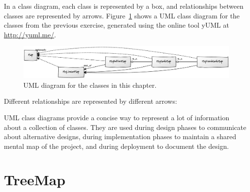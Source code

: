 \documentclass[12pt]{book}
\theoremstyle{exercise}
\newcommand{\java}{\verb}%}
\begin{document}
In a class diagram, each class is represented by a box, and
relationships between classes are represented by
arrows. Figure~\ref{fig-uml} shows a UML class diagram for the classes
from the previous exercise, generated using the online tool yUML at
\url{http://yuml.me/}.

\begin{figure}
\centering
\includegraphics[width=5in]{figs/yuml1.pdf}
\caption{UML diagram for the classes in this chapter.}
\label{fig-uml}
\end{figure}


Different relationships are represented by different arrows:


UML class diagrams provide a concise way to represent a lot of
information about a collection of classes. They are used during design
phases to communicate about alternative designs, during implementation
phases to maintain a shared mental map of the project, and during
deployment to document the design.


\chapter{TreeMap}
\end{document}
